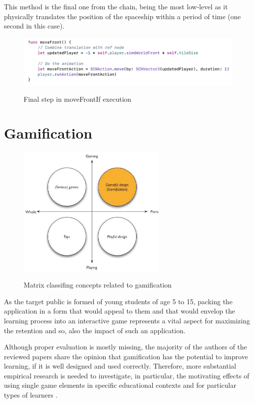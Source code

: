 \documentclass[12 pct]{report}
\begin{document}
This method is the final one from the chain, being the most low-level as it physically translates the position of the spaceship within a period of time (one second in this case).
\begin{figure}[H]
\includegraphics[width=1.0\textwidth]{move-front-if-4}
\centering
\label{fig:feature-points}
\caption{ Final step in moveFrontIf execution}
\end{figure}


\section{Gamification}
\begin{figure}[H]
\includegraphics[width=0.65\textwidth]{gamification}
\centering
\label{fig:feature-points}
\caption{ Matrix classifing concepts related to gamification \cite{deterding2011gamification} }
\end{figure}

As the target public is formed of young students of age 5 to 15, packing the application in a form that would appeal to them and that would envelop the learning process into an interactive game represents a vital aspect for maximizing the retention and so, also the impact of such an application. 

Although proper evaluation is mostly missing, the majority of the authors of the reviewed papers share the opinion that gamification has the potential to improve learning, if it is well designed and used correctly. Therefore, more substantial empirical research is needed to investigate, in particular, the motivating effects of using single game elements in specific educational contexts and for particular types of learners \cite{dicheva2015gamification}. 
\end{document}
